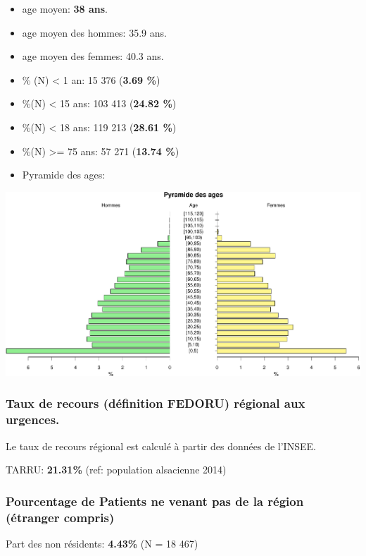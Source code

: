 \documentclass[]{article}
\begin{document}
\begin{itemize}
\item
  age moyen: \textbf{38 ans}.
\item
  age moyen des hommes: 35.9 ans.
\item
  age moyen des femmes: 40.3 ans.
\item
  \% (N) \textless{} 1 an: 15 376 (\textbf{3.69 \%})
\item
  \%(N) \textless{} 15 ans: 103 413 (\textbf{24.82 \%})
\item
  \%(N) \textless{} 18 ans: 119 213 (\textbf{28.61 \%})
\item
  \%(N) \textgreater{}= 75 ans: 57 271 (\textbf{13.74 \%})
\item
  Pyramide des ages:
\end{itemize}

\includegraphics{Figs/pyramide-1.pdf}

\subsubsection{Taux de recours (définition FEDORU) régional aux
urgences.}\label{taux-de-recours-definition-fedoru-regional-aux-urgences.}

Le taux de recours régional est calculé à partir des données de l'INSEE.

TARRU: \textbf{21.31\%} (ref: population alsacienne 2014)

\subsubsection{Pourcentage de Patients ne venant pas de la région
(étranger
compris)}\label{pourcentage-de-patients-ne-venant-pas-de-la-region-etranger-compris}

Part des non résidents: \textbf{4.43\%} (N = 18 467)
\end{document}
